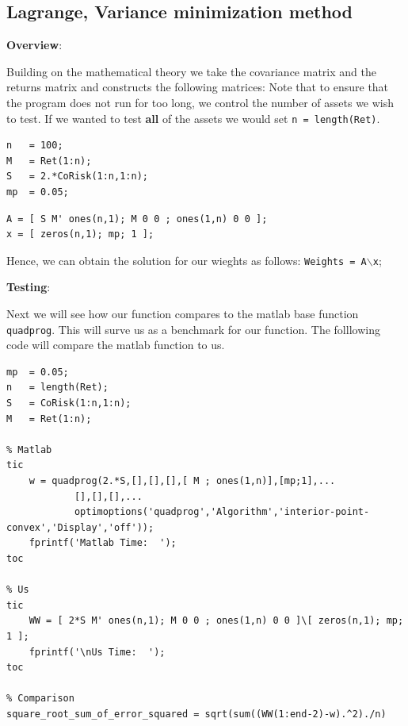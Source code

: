 \documentclass[12pt,titlepage,a4paper]{article}
\begin{document}
\subsection*{Lagrange, Variance minimization method}

\begin{par}
\textbf{Overview}:
\end{par} \vspace{1em}
\begin{par}
Building on the mathematical theory we take the covariance matrix and the returns matrix and constructs the following matrices: Note that to ensure that the program does not run for too long, we control the number of assets we wish to test. If we wanted to test \textbf{all} of the assets we would set \texttt{n = length(Ret)}.
\end{par} \vspace{1em}
\begin{verbatim}n   = 100;
M   = Ret(1:n);
S   = 2.*CoRisk(1:n,1:n);
mp  = 0.05;\end{verbatim}
\begin{verbatim}A = [ S M' ones(n,1); M 0 0 ; ones(1,n) 0 0 ];
x = [ zeros(n,1); mp; 1 ];\end{verbatim}
\begin{par}
Hence, we can obtain the solution for our wieghts as follows: \texttt{Weights = A\ensuremath{\backslash}x};
\end{par} \vspace{1em}
\begin{par}
\textbf{Testing}:
\end{par} \vspace{1em}
\begin{par}
Next we will see how our function compares to the matlab base function \texttt{quadprog}. This will surve us as a benchmark for our function. The folllowing code will compare the matlab function to us.
\end{par} \vspace{1em}
\begin{verbatim}
mp  = 0.05;
n   = length(Ret);
S   = CoRisk(1:n,1:n);
M   = Ret(1:n);

% Matlab
tic
    w = quadprog(2.*S,[],[],[],[ M ; ones(1,n)],[mp;1],...
            [],[],[],...
            optimoptions('quadprog','Algorithm','interior-point-convex','Display','off'));
    fprintf('Matlab Time:  ');
toc

% Us
tic
    WW = [ 2*S M' ones(n,1); M 0 0 ; ones(1,n) 0 0 ]\[ zeros(n,1); mp; 1 ];
    fprintf('\nUs Time:  ');
toc

% Comparison
square_root_sum_of_error_squared = sqrt(sum((WW(1:end-2)-w).^2)./n)
\end{verbatim}
\end{document}
